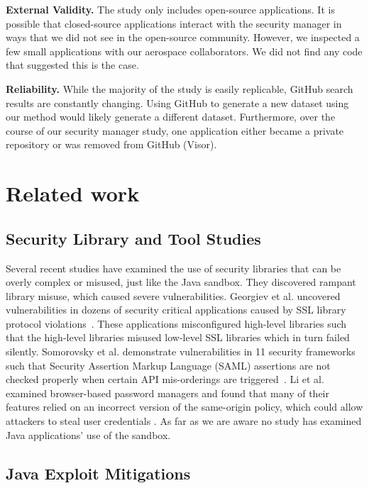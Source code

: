\documentclass{sig-alternate}
\newcommand{\minisec}[1]{\vspace{2ex}\noindent\textbf{#1}}
\begin{document}
\minisec{External Validity.}
The study only includes open-source applications. It is possible
that closed-source applications interact with the security manager
in ways that we did not see in the open-source community. However,
we inspected a few small applications with our aerospace collaborators.
We did not find any code that suggested this is the case. 

\minisec{Reliability.}
While the majority of the study is easily replicable, GitHub search results are constantly
changing. Using GitHub to generate a new dataset using our method
would likely generate a different dataset. Furthermore, over the course of our security
manager study, one application either became a private repository
or was removed from GitHub (Visor).

\section{Related work}
\label{sec:related}

\subsection{Security Library and Tool Studies}

Several recent studies have examined the use of security libraries that can be overly complex or misused, just like the Java sandbox. They discovered rampant library misuse, which caused severe vulnerabilities.
Georgiev et al. uncovered vulnerabilities in dozens of security critical
applications caused by SSL library protocol violations~\cite{georgiev12most-dangerous}.
These applications misconfigured high-level libraries such that the
high-level libraries misused low-level SSL libraries which in turn
failed silently. Somorovsky et al. demonstrate vulnerabilities in
11 security frameworks such that Security Assertion Markup Language
(SAML) assertions are not checked properly when certain API mis-orderings
are triggered~\cite{somorovsky12breaking}. Li et al. examined browser-based
password managers and found that many of their features relied on
an incorrect version of the same-origin policy, which could allow
attackers to steal user credentials \cite{li2014emperor}. As far
as we are aware no study has examined Java applications' use of the
sandbox. 

\subsection{Java Exploit Mitigations}\label{sub:Related-Work-Mitigation}
\end{document}
